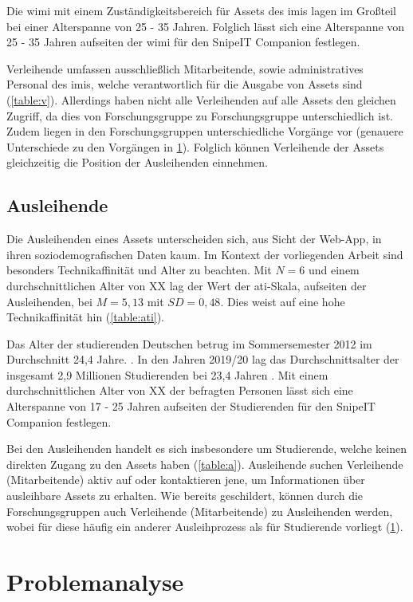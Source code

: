 Die \ac{wimi} mit einem Zuständigkeitsbereich für Assets des \ac{imis} lagen im Großteil bei einer
Alterspanne von 25 - 35 Jahren. Folglich lässt sich eine Alterspanne von 25 - 35 Jahren aufseiten
der \ac{wimi} für den SnipeIT Companion festlegen.

Verleihende umfassen ausschließlich Mitarbeitende, sowie administratives Personal des \ac{imis},
welche verantwortlich für die Ausgabe von Assets sind (\ref{table:v}). Allerdings haben nicht alle
Verleihenden auf alle Assets den gleichen Zugriff, da dies von Forschungsgruppe zu Forschungsgruppe
unterschiedlich ist. Zudem liegen in den Forschungsgruppen unterschiedliche Vorgänge vor (genauere
Unterschiede zu den Vorgängen in \ref{section:iststand}). Folglich können Verleihende der Assets
gleichzeitig die Position der Ausleihenden einnehmen.

\subsection{Ausleihende}
Die Ausleihenden eines Assets unterscheiden sich, aus Sicht der Web-App, in ihren
soziodemografischen Daten kaum. Im Kontext der vorliegenden Arbeit sind besonders Technikaffinität
und Alter zu beachten.
Mit $N=6$ und einem durchschnittlichen Alter von XX lag der Wert der \ac{ati}-Skala, aufseiten der
Ausleihenden, bei $M=5,13$ mit $SD=0,48$. Dies weist auf eine hohe Technikaffinität hin
(\ref{table:ati}).

Das Alter der studierenden Deutschen betrug im Sommersemester 2012 im Durchschnitt 24,4 Jahre.
\cite{middendorff2017wirtschaftliche}. In den Jahren 2019/20 lag das Durchschnittsalter der
insgesamt 2,9 Millionen Studierenden bei 23,4 Jahren \cite{noauthor_studierende_nodate}. Mit einem
durchschnittlichen Alter von XX der befragten Personen lässt sich eine Alterspanne von 17 - 25
Jahren aufseiten der Studierenden für den SnipeIT Companion festlegen.

Bei den Ausleihenden handelt es sich insbesondere um Studierende, welche keinen direkten Zugang zu
den Assets haben (\ref{table:a}). Ausleihende suchen Verleihende (Mitarbeitende) aktiv auf oder
kontaktieren jene, um Informationen über ausleihbare Assets zu erhalten. Wie bereits geschildert,
können durch die Forschungsgruppen auch Verleihende (Mitarbeitende) zu Ausleihenden werden, wobei
für diese häufig ein anderer Ausleihprozess als für Studierende vorliegt (\ref{section:iststand}).


\section{Problemanalyse}
\label{section:iststand}

